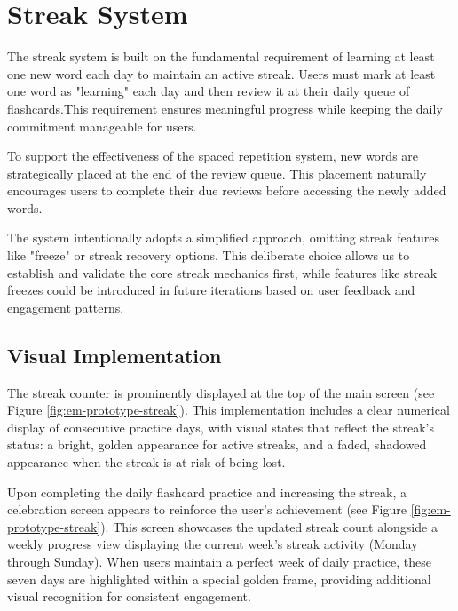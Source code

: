 \section{Streak System}

The streak system is built on the fundamental requirement of learning at least one new word each day to maintain an active streak. Users must mark at least one word as "learning" each day and then review it at their daily queue of flashcards.This requirement ensures meaningful progress while keeping the daily commitment manageable for users. 

To support the effectiveness of the spaced repetition system, new words are strategically placed at the end of the review queue. This placement naturally encourages users to complete their due reviews before accessing the newly added words.

The system intentionally adopts a simplified approach, omitting streak features like "freeze" or streak recovery options. This deliberate choice allows us to establish and validate the core streak mechanics first, while features like streak freezes could be introduced in future iterations based on user feedback and engagement patterns.

\subsection*{Visual Implementation}

The streak counter is prominently displayed at the top of the main screen (see Figure \ref{fig:em-prototype-streak}). This implementation includes a clear numerical display of consecutive practice days, with visual states that reflect the streak's status: a bright, golden appearance for active streaks, and a faded, shadowed appearance when the streak is at risk of being lost.

Upon completing the daily flashcard practice and increasing the streak, a celebration screen appears to reinforce the user's achievement (see Figure \ref{fig:em-prototype-streak}). This screen showcases the updated streak count alongside a weekly progress view displaying the current week's streak activity (Monday through Sunday). When users maintain a perfect week of daily practice, these seven days are highlighted within a special golden frame, providing additional visual recognition for consistent engagement.


